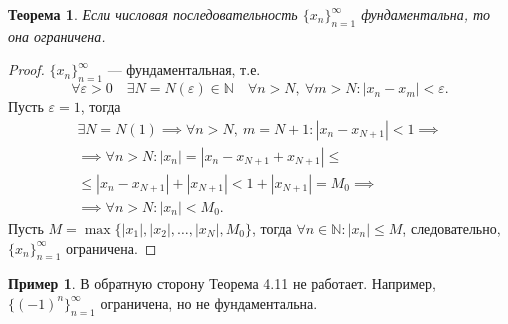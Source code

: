 \documentclass[a4paper,12pt]{article} %
\newtheorem{theorem}{Теорема}[section]
\theoremstyle{remark}
\theoremstyle{definition}
\newtheorem{exmp}{Пример}[section]
\begin{document}
\begin{theorem}
	Если числовая последовательность $\{x_n\}_{n=1}^{\infty}$ фундаментальна, то она ограничена.
\end{theorem}
\begin{proof}
	$\{x_n\}_{n=1}^{\infty}$ --- фундаментальная, т.е. 
	\[
	\forall \varepsilon>0 \quad \exists N=N(\varepsilon)\in \mathbb{N} \quad \forall n>N, \ \forall m>N : |x_n-x_m| < \varepsilon
	.\] 
	Пусть $\varepsilon=1$, тогда
	\begin{multline}
	\exists N=N(1) \implies \forall n>N, \ m=N+1 : |x_n - x_{N+1}|<1 \implies \\
	\implies \forall n>N : |x_n| = |x_n - x_{N+1} + x_{N+1}| \le \\
	\le |x_n - x_{N+1}| + |x_{N+1}| < 1 + |x_{N+1}| = M_0 \implies \\
	\implies \forall n>N : |x_n| < M_0.
	\end{multline}
	Пусть $M = \max \{|x_1|, |x_2|, \ldots, |x_N|, M_0\}$, тогда $\forall n\in \mathbb{N} : |x_n| \le M$, следовательно, $\{x_n\}_{n=1}^{\infty}$ ограничена.
\end{proof}

\begin{exmp}
	В обратную сторону Теорема 4.11 не работает. Например, $\{(-1)^{n}\}_{n=1}^{\infty}$ ограничена, но не фундаментальна.
	\begin{center}
	\end{center}
\end{exmp}
\end{document}
